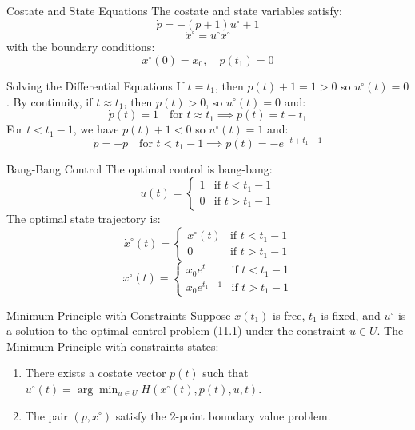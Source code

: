 \documentclass[10pt]{beamer}
\begin{document}
\begin{frame}[fragile]{Costate and State Equations}
  The costate and state variables satisfy:
  \[
  \dot{p} = -(p + 1)u^\circ + 1
  \]
  \[
  \dot{x}^\circ = u^\circ x^\circ
  \]
  with the boundary conditions:
  \[
  x^\circ(0) = x_0, \quad p(t_1) = 0
  \]
\end{frame}
  
\begin{frame}[fragile]{Solving the Differential Equations}
  If \( t = t_1 \), then \( p(t) + 1 = 1 > 0 \) so \( u^\circ(t) = 0 \). By continuity, if \( t \approx t_1 \), then \( p(t) > 0 \), so \( u^\circ(t) = 0 \) and:
  \[
  \dot{p}(t) = 1 \quad \text{for } t \approx t_1 \implies p(t) = t - t_1
  \]
  For \( t < t_1 - 1 \), we have \( p(t) + 1 < 0 \) so \( u^\circ(t) = 1 \) and:
  \[
  \dot{p} = -p \quad \text{for } t < t_1 - 1 \implies p(t) = -e^{-t + t_1 - 1}
  \]
\end{frame}
  
\begin{frame}[fragile]{Bang-Bang Control}
  The optimal control is bang-bang:
  \[
  u(t) = \begin{cases}
  1 & \text{if } t < t_1 - 1 \\
  0 & \text{if } t > t_1 - 1
  \end{cases}
  \]
  The optimal state trajectory is:
  \[
  \dot{x}^\circ(t) = \begin{cases}
  x^\circ(t) & \text{if } t < t_1 - 1 \\
  0 & \text{if } t > t_1 - 1
  \end{cases}
  \]
  \[
  x^\circ(t) = \begin{cases}
  x_0 e^t & \text{if } t < t_1 - 1 \\
  x_0 e^{t_1 - 1} & \text{if } t > t_1 - 1
  \end{cases}
  \]
\end{frame}
  
\begin{frame}[fragile]{Minimum Principle with Constraints}
  Suppose \( x(t_1) \) is free, \( t_1 \) is fixed, and \( u^\circ \) is a solution to the optimal control problem (11.1) under the constraint \( u \in U \). The Minimum Principle with constraints states:
  \begin{enumerate}
      \item There exists a costate vector \( p(t) \) such that \( u^\circ(t) = \arg \min_{u \in U} H(x^\circ(t), p(t), u, t) \).
      \item The pair \( (p, x^\circ) \) satisfy the 2-point boundary value problem.
  \end{enumerate}
\end{frame}
  
\end{document}
